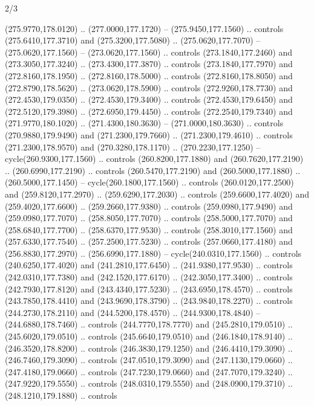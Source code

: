 \begin{flagdescription}{2/3}
\begin{scope}[xshift=0.5\flaglength,yshift=0.5\flagwidth,scale=\flagwidth/259.2]
\begin{scope}[y=0.8pt, x=0.8pt, yscale=-1,shift={(-243,-162)}]
      (275.9770,178.0120) .. (277.0000,177.1720) -- (275.9450,177.1560) .. controls
      (275.6410,177.3710) and (275.3200,177.5080) .. (275.0620,177.7070) --
      (275.0620,177.1560) -- (273.0620,177.1560) .. controls (273.1840,177.2460) and
      (273.3050,177.3240) .. (273.4300,177.3870) .. controls (273.1840,177.7970) and
      (272.8160,178.1950) .. (272.8160,178.5000) .. controls (272.8160,178.8050) and
      (272.8790,178.5620) .. (273.0620,178.5900) .. controls (272.9260,178.7730) and
      (272.4530,179.0350) .. (272.4530,179.3400) .. controls (272.4530,179.6450) and
      (272.5120,179.3980) .. (272.6950,179.4450) .. controls (272.2540,179.7340) and
      (271.9770,180.1020) .. (271.4300,180.3630) -- (271.0000,180.3630) .. controls
      (270.9880,179.9490) and (271.2300,179.7660) .. (271.2300,179.4610) .. controls
      (271.2300,178.9570) and (270.3280,178.1170) .. (270.2230,177.1250) --
      cycle(260.9300,177.1560) .. controls (260.8200,177.1880) and
      (260.7620,177.2190) .. (260.6990,177.2190) .. controls (260.5470,177.2190) and
      (260.5000,177.1880) .. (260.5000,177.1450) -- cycle(260.1800,177.1560) ..
      controls (260.0120,177.2500) and (259.8120,177.2970) .. (259.6290,177.2030) ..
      controls (259.6600,177.4020) and (259.4020,177.6600) .. (259.2660,177.9380) ..
      controls (259.0980,177.9490) and (259.0980,177.7070) .. (258.8050,177.7070) ..
      controls (258.5000,177.7070) and (258.6840,177.7700) .. (258.6370,177.9530) ..
      controls (258.3010,177.1560) and (257.6330,177.7540) .. (257.2500,177.5230) ..
      controls (257.0660,177.4180) and (256.8830,177.2970) .. (256.6990,177.1880) --
      cycle(240.0310,177.1560) .. controls (240.6250,177.4020) and
      (241.2810,177.6450) .. (241.9380,177.9530) .. controls (242.0310,177.7380) and
      (242.1520,177.6170) .. (242.3050,177.3400) .. controls (242.7930,177.8120) and
      (243.4340,177.5230) .. (243.6950,178.4570) .. controls (243.7850,178.4410) and
      (243.9690,178.3790) .. (243.9840,178.2270) .. controls (244.2730,178.2110) and
      (244.5200,178.4570) .. (244.9300,178.4840) -- (244.6880,178.7460) .. controls
      (244.7770,178.7770) and (245.2810,179.0510) .. (245.6020,179.0510) .. controls
      (245.6640,179.0510) and (246.1840,178.9140) .. (246.3520,178.8200) .. controls
      (246.3830,179.1250) and (246.4410,179.3090) .. (246.7460,179.3090) .. controls
      (247.0510,179.3090) and (247.1130,179.0660) .. (247.4180,179.0660) .. controls
      (247.7230,179.0660) and (247.7070,179.3240) .. (247.9220,179.5550) .. controls
      (248.0310,179.5550) and (248.0900,179.3710) .. (248.1210,179.1880) .. controls

\end{scope}
\end{scope}
\end{flagdescription}
